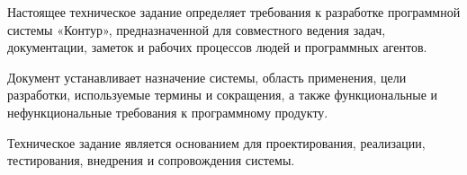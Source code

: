 
Настоящее техническое задание определяет требования к разработке программной системы «Контур», предназначенной для совместного ведения задач, документации, заметок и рабочих процессов людей и программных агентов.

Документ устанавливает назначение системы, область применения, цели разработки, используемые термины и сокращения, а также функциональные и нефункциональные требования к программному продукту.

Техническое задание является основанием для проектирования, реализации, тестирования, внедрения и сопровождения системы.